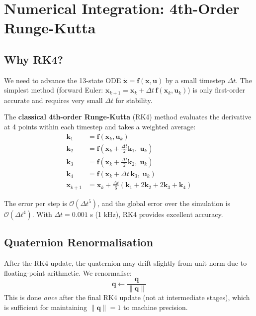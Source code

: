 \documentclass[12pt, a4paper]{article}
\newcommand{\bx}{\bm{x}}
\newcommand{\bu}{\bm{u}}
\newcommand{\bq}{\bm{q}}
\begin{document}
\section{Numerical Integration: 4th-Order Runge-Kutta}
\label{sec:rk4}

\subsection{Why RK4?}

We need to advance the 13-state ODE $\dot{\bx} = \bm{f}(\bx, \bu)$ by a small timestep $\Delta t$.  The simplest method (forward Euler: $\bx_{k+1} = \bx_k + \Delta t \, \bm{f}(\bx_k, \bu_k)$) is only first-order accurate and requires very small $\Delta t$ for stability.

The \textbf{classical 4th-order Runge-Kutta} (RK4) method evaluates the derivative at 4 points within each timestep and takes a weighted average:
\begin{align}
    \bm{k}_1 &= \bm{f}(\bx_k, \bu_k) \\
    \bm{k}_2 &= \bm{f}\!\left(\bx_k + \tfrac{\Delta t}{2} \bm{k}_1, \; \bu_k\right) \\
    \bm{k}_3 &= \bm{f}\!\left(\bx_k + \tfrac{\Delta t}{2} \bm{k}_2, \; \bu_k\right) \\
    \bm{k}_4 &= \bm{f}(\bx_k + \Delta t \, \bm{k}_3, \; \bu_k) \\[4pt]
    \bx_{k+1} &= \bx_k + \frac{\Delta t}{6} \left( \bm{k}_1 + 2\bm{k}_2 + 2\bm{k}_3 + \bm{k}_4 \right)
\end{align}

The error per step is $\mathcal{O}(\Delta t^5)$, and the global error over the simulation is $\mathcal{O}(\Delta t^4)$.  With $\Delta t = 0.001$ s (1 kHz), RK4 provides excellent accuracy.

\subsection{Quaternion Renormalisation}

After the RK4 update, the quaternion may drift slightly from unit norm due to floating-point arithmetic.  We renormalise:
\begin{equation}
    \bq \leftarrow \frac{\bq}{\|\bq\|}
\end{equation}
This is done \emph{once} after the final RK4 update (not at intermediate stages), which is sufficient for maintaining $\|\bq\| = 1$ to machine precision.
\end{document}
